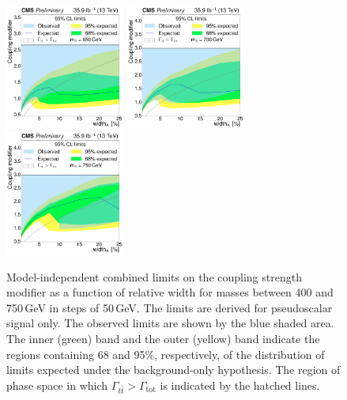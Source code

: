 \begin{figure}[!Hhtb]
\includegraphics[width=0.35\textwidth,keepaspectratio=true]{fig/chapt8/limits/limit_A_M650.pdf}
\includegraphics[width=0.35\textwidth,keepaspectratio=true]{fig/chapt8/limits/limit_A_M700.pdf}
\includegraphics[width=0.35\textwidth,keepaspectratio=true]{fig/chapt8/limits/limit_A_M750.pdf}
\caption{Model-independent combined limits on the coupling strength modifier as a function of relative width for masses between 400 and 750\,GeV in steps of 50\,GeV. The limits are derived for pseudoscalar signal only. The observed limits are shown by the blue shaded area. The inner (green) band and the outer (yellow) band indicate the regions containing 68 and 95\%, respectively, of the distribution of limits expected under the background-only hypothesis. The region of phase space in which $\Gamma_{t\bar t}>\Gamma_\mathrm{tot}$ is indicated by the hatched lines.}
\label{fig:limits_a_masses}
\end{figure}

